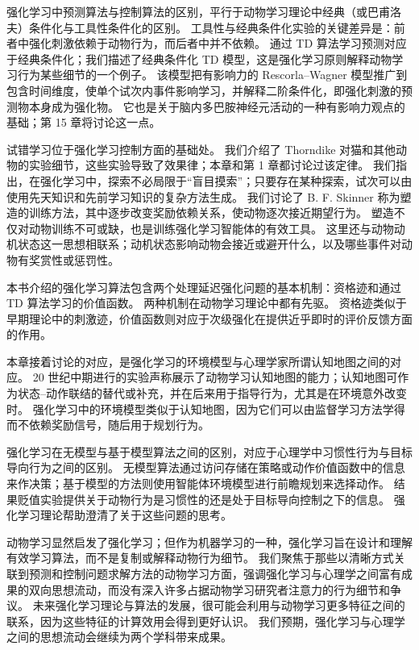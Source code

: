 \documentclass[UTF8, 12pt, fontset=fandol, oneside]{ctexart}
\begin{document}
强化学习中预测算法与控制算法的区别，平行于动物学习理论中经典（或巴甫洛夫）条件化与工具性条件化的区别。
工具性与经典条件化实验的关键差异是：前者中强化刺激依赖于动物行为，而后者中并不依赖。
通过 TD 算法学习预测对应于经典条件化；我们描述了经典条件化 TD 模型，这是强化学习原则解释动物学习行为某些细节的一个例子。
该模型把有影响力的 Rescorla--Wagner 模型推广到包含时间维度，使单个试次内事件影响学习，并解释二阶条件化，即强化刺激的预测物本身成为强化物。
它也是关于脑内多巴胺神经元活动的一种有影响力观点的基础；第 15 章将讨论这一点。

试错学习位于强化学习控制方面的基础处。
我们介绍了 Thorndike 对猫和其他动物的实验细节，这些实验导致了效果律；本章和第 1 章都讨论过该定律。
我们指出，在强化学习中，探索不必局限于“盲目摸索”；只要存在某种探索，试次可以由使用先天知识和先前学习知识的复杂方法生成。
我们讨论了 B. F. Skinner 称为塑造的训练方法，其中逐步改变奖励依赖关系，使动物逐次接近期望行为。
塑造不仅对动物训练不可或缺，也是训练强化学习智能体的有效工具。
这里还与动物动机状态这一思想相联系；动机状态影响动物会接近或避开什么，以及哪些事件对动物有奖赏性或惩罚性。

本书介绍的强化学习算法包含两个处理延迟强化问题的基本机制：资格迹和通过 TD 算法学习的价值函数。
两种机制在动物学习理论中都有先驱。
资格迹类似于早期理论中的刺激迹，价值函数则对应于次级强化在提供近乎即时的评价反馈方面的作用。

本章接着讨论的对应，是强化学习的环境模型与心理学家所谓认知地图之间的对应。
20 世纪中期进行的实验声称展示了动物学习认知地图的能力；认知地图可作为状态--动作联结的替代或补充，并在后来用于指导行为，尤其是在环境意外改变时。
强化学习中的环境模型类似于认知地图，因为它们可以由监督学习方法学得而不依赖奖励信号，随后用于规划行为。

强化学习在无模型与基于模型算法之间的区别，对应于心理学中习惯性行为与目标导向行为之间的区别。
无模型算法通过访问存储在策略或动作价值函数中的信息来作决策；基于模型的方法则使用智能体环境模型进行前瞻规划来选择动作。
结果贬值实验提供关于动物行为是习惯性的还是处于目标导向控制之下的信息。
强化学习理论帮助澄清了关于这些问题的思考。

动物学习显然启发了强化学习；但作为机器学习的一种，强化学习旨在设计和理解有效学习算法，而不是复制或解释动物行为细节。
我们聚焦于那些以清晰方式关联到预测和控制问题求解方法的动物学习方面，强调强化学习与心理学之间富有成果的双向思想流动，而没有深入许多占据动物学习研究者注意力的行为细节和争议。
未来强化学习理论与算法的发展，很可能会利用与动物学习更多特征之间的联系，因为这些特征的计算效用会得到更好认识。
我们预期，强化学习与心理学之间的思想流动会继续为两个学科带来成果。
\end{document}
